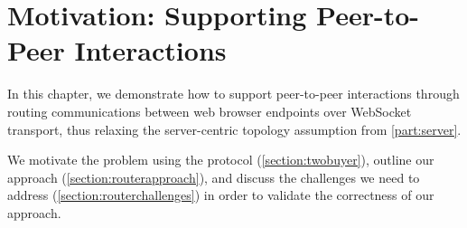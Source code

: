 \chapter{Motivation: Supporting Peer-to-Peer Interactions}
\label{chap:p2p}

In this chapter,
we demonstrate how to support peer-to-peer interactions
through routing communications
between web browser endpoints over WebSocket transport,
thus relaxing the server-centric topology assumption from 
\cref{part:server}.

We motivate the problem using the 
 protocol (\cref{section:twobuyer}),
outline our approach (\cref{section:routerapproach}),
and discuss the challenges we need to address 
(\cref{section:routerchallenges}) in order to validate the
correctness of our approach.





